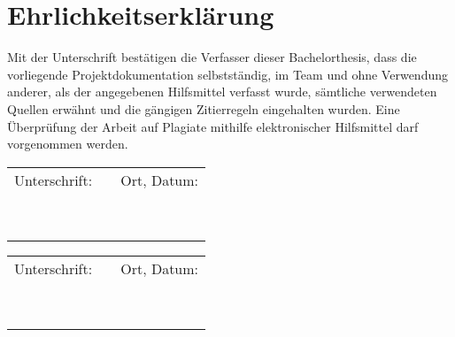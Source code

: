 \section{Ehrlichkeitserklärung}\label{sec:Ehrlichkeitserklärung}
Mit der Unterschrift bestätigen die Verfasser dieser Bachelorthesis, dass die vorliegende Projektdokumentation selbstständig, im Team und ohne Verwendung anderer, als der angegebenen Hilfsmittel verfasst wurde, sämtliche verwendeten Quellen erwähnt und die gängigen Zitierregeln eingehalten wurden. Eine Überprüfung der Arbeit auf Plagiate mithilfe elektronischer Hilfsmittel darf vorgenommen werden.


\vspace{20mm}


\begin{center}
		\renewcommand{\arraystretch}{1}
	\begin{tabular}{lp{5em}l} 
  
		
		Unterschrift:   && Ort, Datum: \\
		&&\\
		\hspace{5cm}   && \hspace{5cm} \\\cline{1-1}\cline{3-3}
		&&\\
		&&\\
		

  
  \ \\
 \end{tabular}
 
 	\begin{tabular}{lp{5em}l} 
  
		
		Unterschrift:   && Ort, Datum: \\
		&&\\
		\hspace{5cm}   && \hspace{5cm} \\\cline{1-1}\cline{3-3}
		&&\\
		&&\\
		

  
  \ \\
 \end{tabular}
 \end{center}




